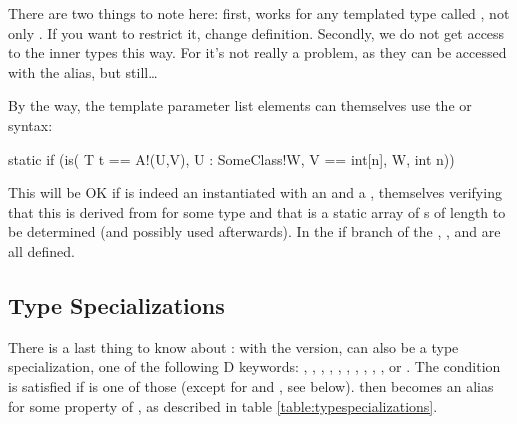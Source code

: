 There are two things to note here: first,  works for any templated type called , not only . If you want to restrict it, change  definition. Secondly, we do not get access to the inner types this way. For  it's not really a problem, as they can be accessed with the  alias, but still\ldots

By the way, the template parameter list elements can themselves use the  or  syntax:

\begin{dcode}
static if (is( T t == A!(U,V), U : SomeClass!W, V == int[n], W, int n))
\end{dcode}

This will be OK if  is indeed an  instantiated with an  and a , themselves verifying that this  is derived from  for some  type and that  is a static array of s of length  to be determined (and possibly used afterwards). In the if branch of the  , ,  and  are all defined. 

\subsection{Type Specializations}\label{typespecializations}

There is a last thing to know about : with the  version,  can also be a type specialization, one of the following D keywords: , , , , , , , , , ,  or . The condition is satisfied if  is one of those (except for  and , see below).  then becomes an alias for some property of , as described in table \ref{table:typespecializations}.

